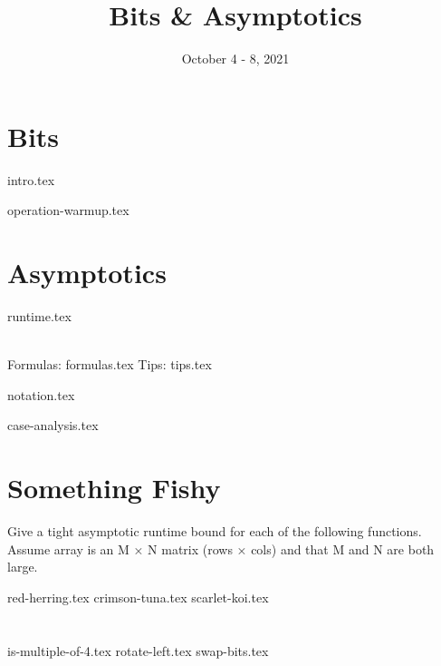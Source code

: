 \documentclass[11pt]{exam}
\title{Bits \& Asymptotics}
\date{October 4 - 8, 2021}
\begin{document}
\maketitle

\section{Bits}
{intro.tex}

\begin{questions}

{operation-warmup.tex}
\end{questions}

\clearpage

\section{Asymptotics}
\begin{questions}
{runtime.tex}

\\Formulas:
{formulas.tex}
Tips:
{tips.tex}

{notation.tex}

{case-analysis.tex}
\end{questions}

\clearpage

\section{Something Fishy}
Give a tight asymptotic runtime bound for each of the following functions. Assume array is an M × N matrix (rows × cols) and that M and N are both large.
\begin{questions}
{red-herring.tex}
{crimson-tuna.tex}
{scarlet-koi.tex}
\end{questions}

\clearpage


\section{}
\begin{questions}
{is-multiple-of-4.tex}
{rotate-left.tex}
{swap-bits.tex}
\end{questions}
\end{document}
